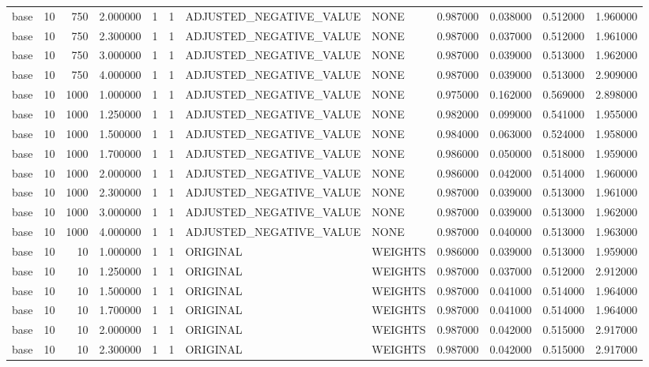 \begin{tabular}{lrrrllllrrrr}
base & 10 & 750 & 2.000000 & 1 & 1 & ADJUSTED_NEGATIVE_VALUE & NONE & 0.987000 & 0.038000 & 0.512000 & 1.960000 \\
base & 10 & 750 & 2.300000 & 1 & 1 & ADJUSTED_NEGATIVE_VALUE & NONE & 0.987000 & 0.037000 & 0.512000 & 1.961000 \\
base & 10 & 750 & 3.000000 & 1 & 1 & ADJUSTED_NEGATIVE_VALUE & NONE & 0.987000 & 0.039000 & 0.513000 & 1.962000 \\
base & 10 & 750 & 4.000000 & 1 & 1 & ADJUSTED_NEGATIVE_VALUE & NONE & 0.987000 & 0.039000 & 0.513000 & 2.909000 \\
base & 10 & 1000 & 1.000000 & 1 & 1 & ADJUSTED_NEGATIVE_VALUE & NONE & 0.975000 & 0.162000 & 0.569000 & 2.898000 \\
base & 10 & 1000 & 1.250000 & 1 & 1 & ADJUSTED_NEGATIVE_VALUE & NONE & 0.982000 & 0.099000 & 0.541000 & 1.955000 \\
base & 10 & 1000 & 1.500000 & 1 & 1 & ADJUSTED_NEGATIVE_VALUE & NONE & 0.984000 & 0.063000 & 0.524000 & 1.958000 \\
base & 10 & 1000 & 1.700000 & 1 & 1 & ADJUSTED_NEGATIVE_VALUE & NONE & 0.986000 & 0.050000 & 0.518000 & 1.959000 \\
base & 10 & 1000 & 2.000000 & 1 & 1 & ADJUSTED_NEGATIVE_VALUE & NONE & 0.986000 & 0.042000 & 0.514000 & 1.960000 \\
base & 10 & 1000 & 2.300000 & 1 & 1 & ADJUSTED_NEGATIVE_VALUE & NONE & 0.987000 & 0.039000 & 0.513000 & 1.961000 \\
base & 10 & 1000 & 3.000000 & 1 & 1 & ADJUSTED_NEGATIVE_VALUE & NONE & 0.987000 & 0.039000 & 0.513000 & 1.962000 \\
base & 10 & 1000 & 4.000000 & 1 & 1 & ADJUSTED_NEGATIVE_VALUE & NONE & 0.987000 & 0.040000 & 0.513000 & 1.963000 \\
base & 10 & 10 & 1.000000 & 1 & 1 & ORIGINAL & WEIGHTS & 0.986000 & 0.039000 & 0.513000 & 1.959000 \\
base & 10 & 10 & 1.250000 & 1 & 1 & ORIGINAL & WEIGHTS & 0.987000 & 0.037000 & 0.512000 & 2.912000 \\
base & 10 & 10 & 1.500000 & 1 & 1 & ORIGINAL & WEIGHTS & 0.987000 & 0.041000 & 0.514000 & 1.964000 \\
base & 10 & 10 & 1.700000 & 1 & 1 & ORIGINAL & WEIGHTS & 0.987000 & 0.041000 & 0.514000 & 1.964000 \\
base & 10 & 10 & 2.000000 & 1 & 1 & ORIGINAL & WEIGHTS & 0.987000 & 0.042000 & 0.515000 & 2.917000 \\
base & 10 & 10 & 2.300000 & 1 & 1 & ORIGINAL & WEIGHTS & 0.987000 & 0.042000 & 0.515000 & 2.917000 \\

\end{tabular}
